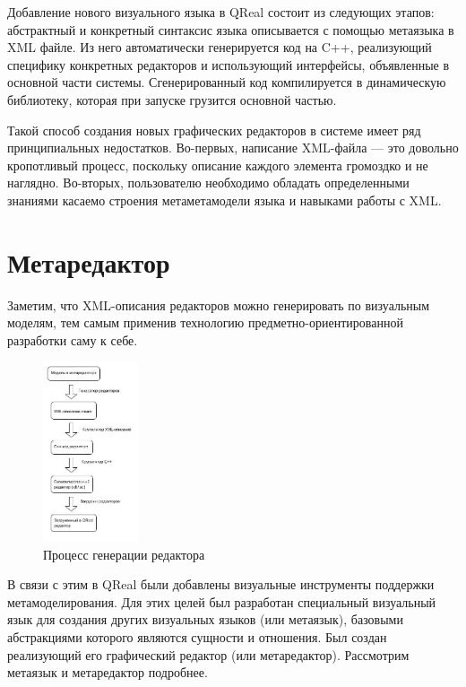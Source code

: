 \documentclass[a4paper]{article}
\begin{document}
Добавление нового визуального языка в QReal состоит из следующих этапов: абстрактный и конкретный синтаксис языка описывается с помощью метаязыка в XML файле. Из него автоматически генерируется код на C++, реализующий специфику конкретных редакторов и использующий интерфейсы, объявленные в основной части системы. Сгенерированный код компилируется в динамическую библиотеку, которая при запуске грузится основной частью.

Такой способ создания новых графических редакторов в системе имеет ряд принципиальных недостатков. Во-первых, написание XML-файла --- это довольно кропотливый процесс, поскольку описание каждого элемента громоздко и не наглядно. Во-вторых, пользователю необходимо обладать определенными знаниями касаемо строения метаметамодели языка и навыками работы с XML.

\section{Метаредактор}

Заметим, что XML-описания редакторов можно генерировать по визуальным моделям, тем самым применив технологию предметно-ориентированной разработки саму к себе.

\begin{figure}[ht]
  \begin{center}
    \includegraphics[width=0.25\textwidth]{editorGeneration.jpg}
    \caption{Процесс генерации редактора}
    \label{editorGeneration}
  \end{center}
\end{figure}

В связи с этим в QReal были добавлены визуальные инструменты поддержки метамоделирования. Для этих целей был разработан специальный визуальный язык для создания других визуальных языков (или метаязык), базовыми абстракциями которого являются сущности и отношения. Был создан реализующий его графический редактор (или метаредактор). Рассмотрим метаязык и метаредактор подробнее. 
\end{document}
